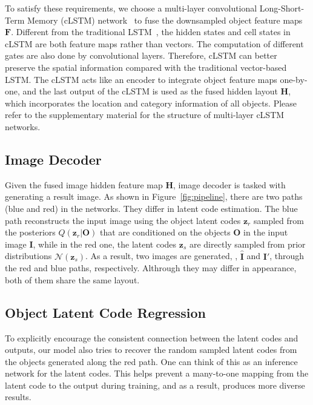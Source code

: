 \documentclass[10pt,twocolumn,letterpaper]{article}
\begin{document}
To satisfy these requirements, we choose a multi-layer convolutional Long-Short-Term Memory (cLSTM) network~\cite{Shi2015} to fuse the downsampled object feature maps $\mathbf{F}$. 
Different from the traditional LSTM~\cite{Hochreiter1997}, the hidden states and cell states in cLSTM are both feature maps rather than vectors. The computation of different gates are also done by convolutional layers. Therefore, cLSTM can better preserve the spatial information compared with the traditional vector-based LSTM.  
The cLSTM acts like an encoder to integrate object feature maps one-by-one, and the last output of the cLSTM is used as the fused hidden layout $\mathbf{H}$, which incorporates the location and category information of all objects. Please refer to the supplementary material for the structure of multi-layer cLSTM networks.

\subsection{Image Decoder}
Given the fused image hidden feature map $\mathbf{H}$, image decoder is tasked with generating a result image.
As shown in Figure~\ref{fig:pipeline}, there are two paths (blue and red) in the networks. They differ in latent code estimation. The blue path reconstructs the input image using the object latent codes $\mathbf{z}_r$ sampled from the posteriors $Q(\mathbf{z}_r | \mathbf{O})$ that are conditioned on the objects $\mathbf{O}$ in the input image $\mathbf{I}$, while in the red one, the latent codes $\mathbf{z}_s$ are directly sampled from prior distributions $\mathcal{N}(\mathbf{z}_s)$. 
As a result, two images are generated, \ie, $\mathbf{\hat{I}}$ and $\mathbf{I}'$, through the red and blue paths, respectively. Althrough they may differ in appearance, both of them share the same layout.





\subsection{Object Latent Code Regression}
To explicitly encourage the consistent connection between the latent codes and outputs, our model also tries to recover the random sampled latent codes from the objects generated along the red path. One can think of this as an inference network for the latent codes. This helps prevent a many-to-one mapping from the latent code to the output during training, and as a result, produces more diverse results.
\end{document}
